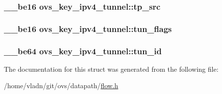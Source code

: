 \subsubsection[{tp\+\_\+src}]{\setlength{\rightskip}{0pt plus 5cm}\+\_\+\+\_\+be16 ovs\+\_\+key\+\_\+ipv4\+\_\+tunnel\+::tp\+\_\+src}\label{structovs__key__ipv4__tunnel_acda46848fad6a931296f3e7a74b44a18}
\hypertarget{structovs__key__ipv4__tunnel_a7459e66ecf90329eb2fa6cf3fc4781db}{}
\subsubsection[{tun\+\_\+flags}]{\setlength{\rightskip}{0pt plus 5cm}\+\_\+\+\_\+be16 ovs\+\_\+key\+\_\+ipv4\+\_\+tunnel\+::tun\+\_\+flags}\label{structovs__key__ipv4__tunnel_a7459e66ecf90329eb2fa6cf3fc4781db}
\hypertarget{structovs__key__ipv4__tunnel_ae36132bc05ca6257b572edddffcb867a}{}
\subsubsection[{tun\+\_\+id}]{\setlength{\rightskip}{0pt plus 5cm}\+\_\+\+\_\+be64 ovs\+\_\+key\+\_\+ipv4\+\_\+tunnel\+::tun\+\_\+id}\label{structovs__key__ipv4__tunnel_ae36132bc05ca6257b572edddffcb867a}


The documentation for this struct was generated from the following file\+:\begin{DoxyCompactItemize}
\item 
/home/vladn/git/ovs/datapath/\hyperlink{flow_8h}{flow.\+h}\end{DoxyCompactItemize}
